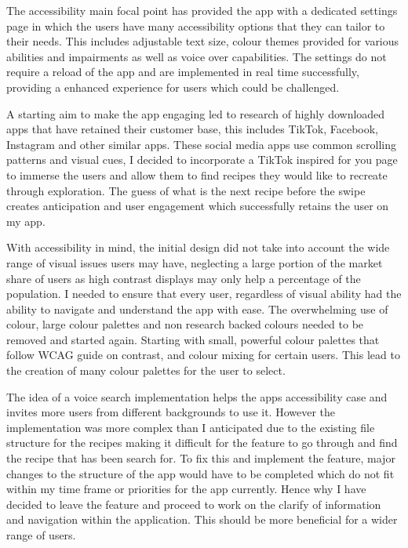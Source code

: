 \documentclass[]{project_final}
\begin{document}
The accessibility main focal point has provided the app with a dedicated settings page in which the users have many accessibility options that they can tailor to their needs. This includes adjustable text size, colour themes provided for various abilities and impairments as well as voice over capabilities. The settings do not require a reload of the app and are implemented in real time successfully, providing a enhanced experience for users which could be challenged.

A starting aim to make the app engaging led to research of highly downloaded apps that have retained their customer base, this includes TikTok, Facebook, Instagram and other similar apps. These social media apps use common scrolling patterns and visual cues, I decided to incorporate a TikTok inspired for you page to immerse the users and allow them to find recipes they would like to recreate through exploration. The guess of what is the next recipe before the swipe creates anticipation and user engagement which successfully retains the user on my app.


With accessibility in mind, the initial design did not take into account the wide range of visual issues users may have, neglecting a large portion of the market share of users as high contrast displays may only help a percentage of the population. I needed to ensure that every user, regardless of visual ability had the ability to navigate and understand the app with ease. The overwhelming use of colour, large colour palettes and non research backed colours needed to be removed and started again. Starting with small, powerful colour palettes that follow WCAG guide on contrast, and colour mixing for certain users. This lead to the creation of many colour palettes for the user to select.

The idea of a voice search implementation helps the apps accessibility case and invites more users from different backgrounds to use it. However the implementation was more complex than I anticipated due to the existing file structure for the recipes making it difficult for the feature to go through and find the recipe that has been search for. To fix this and implement the feature, major changes to the structure of the app would have to be completed which do not fit within my time frame or priorities for the app currently. Hence why I have decided to leave the feature and proceed to work on the clarify of information and navigation within the application. This should be more beneficial for a wider range of users.
\end{document}
